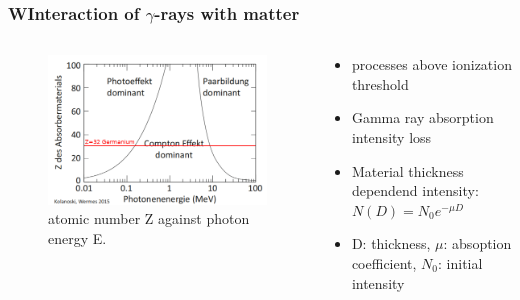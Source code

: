 \documentclass[aspectratio=1610, 9pt]{beamer}
\begin{document}
\begin{frame}\frametitle{WInteraction of $\gamma$-rays with matter}
  \begin{columns}
    \begin{column}[c]{0.48\textwidth}
      \begin{figure}
        \includegraphics[width=\textwidth]{plots/z_depend.png}
        \caption{atomic number Z against photon energy E.}
      \end{figure}
    \end{column}
    \begin{column}[c]{0.48\textwidth}
      \begin{itemize}
        \item processes above ionization threshold
        \item Gamma ray absorption \to intensity loss
        \item Material thickness dependend intensity: $N(D) = N_0 e^{-\mu D}$
        \item D: thickness, $\mu$: absoption coefficient, $N_0$: initial intensity
      \end{itemize}
    \end{column}
  \end{columns}
\end{frame}
\end{document}
